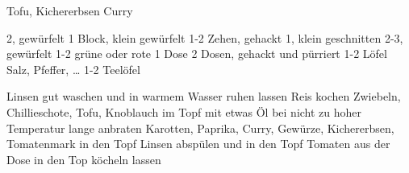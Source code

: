 \begin{recipe}{Tofu, Kichererbsen Curry}

     2, gewürfelt
     1 Block, klein gewürfelt
     1-2 Zehen, gehackt
     1, klein geschnitten
     2-3, gewürfelt
     1-2
     grüne oder rote
     1 Dose 
     2 Dosen, gehackt und pürriert 
     1-2 Löfel
     Salz, Pfeffer, \dots
     1-2 Teelöfel 
    \ingredient{}

    \fivestar
    \ingredient{}

     Linsen gut waschen und in warmem Wasser ruhen lassen 
     Reis kochen 
     Zwiebeln, Chillieschote, Tofu, Knoblauch im Topf mit etwas Öl bei nicht zu hoher Temperatur lange anbraten
     Karotten, Paprika, Curry, Gewürze, Kichererbsen, Tomatenmark in den Topf
     Linsen abspülen und in den Topf
     Tomaten aus der Dose in den Top
     köcheln lassen
\end{recipe}